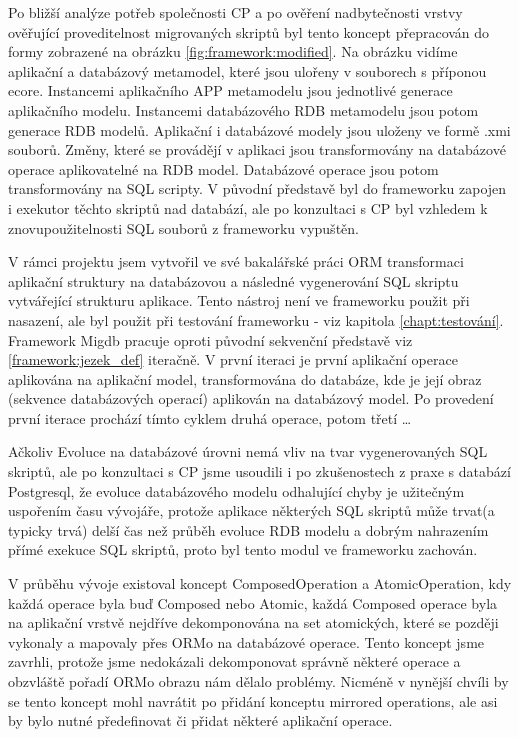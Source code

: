 \documentclass[11pt,twoside,a4paper]{book}
\begin{document}
Po bližší analýze potřeb společnosti CP a po ověření nadbytečnosti vrstvy
ověřující proveditelnost migrovaných skriptů byl tento koncept přepracován do
formy zobrazené na obrázku \ref{fig:framework:modified}. Na obrázku vidíme
aplikační a databázový metamodel, které jsou ulořeny v souborech s příponou
ecore. Instancemi aplikačního APP metamodelu jsou jednotlivé generace
aplikačního modelu.
Instancemi databázového RDB metamodelu jsou potom generace RDB modelů. Aplikační
i databázové modely jsou uloženy ve formě .xmi souborů.  Změny, které se
provádějí v aplikaci jsou transformovány na databázové operace aplikovatelné na
RDB model. Databázové operace jsou potom transformovány na SQL scripty. V
původní představě byl do frameworku zapojen i exekutor těchto skriptů nad
databází, ale po konzultaci s CP byl vzhledem k znovupoužitelnosti SQL souborů
z frameworku vypuštěn. 

V rámci projektu jsem vytvořil ve své bakalářské práci \cite{Lukes} ORM
transformaci aplikační struktury na databázovou a následné vygenerování SQL
skriptu vytvářející strukturu aplikace. Tento nástroj není ve frameworku použit
při nasazení, ale byl použit při testování frameworku - viz
kapitola \ref{chapt:testování}. Framework Migdb pracuje oproti původní
sekvenční představě viz \ref{framework:jezek_def} iteračně. V první iteraci
je první aplikační operace aplikována na aplikační model, transformována do
databáze, kde je její obraz (sekvence databázových operací) aplikován na
databázový model. Po provedení první iterace prochází tímto cyklem druhá
operace, potom třetí \ldots

Ačkoliv Evoluce na databázové úrovni nemá vliv na tvar vygenerovaných SQL
skriptů, ale po konzultaci s CP jsme usoudili i po zkušenostech z praxe s
databází Postgresql, že evoluce databázového modelu odhalující chyby je
užitečným uspořením času vývojáře, protože aplikace některých SQL skriptů může
trvat(a typicky trvá) delší čas než průběh evoluce RDB modelu a dobrým
nahrazením přímé exekuce SQL skriptů, proto byl tento modul ve frameworku
zachován.

V průběhu vývoje existoval koncept ComposedOperation a AtomicOperation, kdy
každá operace byla buď Composed nebo Atomic, každá Composed operace byla na
aplikační vrstvě nejdříve dekomponována na set atomických, které se později
vykonaly a mapovaly přes ORMo na databázové operace. Tento koncept jsme zavrhli,
protože jsme nedokázali dekomponovat správně některé operace a obzvláště
pořadí ORMo obrazu nám dělalo problémy. Nicméně v nynější chvíli by se tento
koncept mohl navrátit po přidání konceptu mirrored operations, ale asi by bylo
nutné předefinovat či přidat některé aplikační operace.
\end{document}

